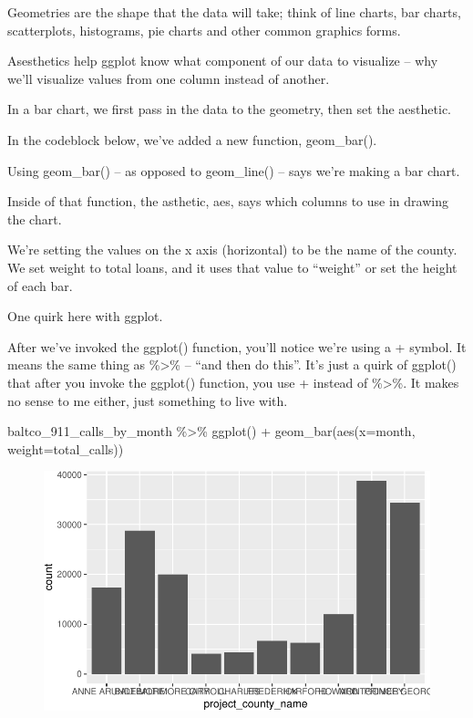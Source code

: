 \documentclass[
  letterpaper,
  DIV=11,
  numbers=noendperiod]{scrreprt}
\newenvironment{Shaded}{\begin{snugshade}}{\end{snugshade}}
\newcommand{\AttributeTok}[1]{\textcolor[rgb]{0.40,0.45,0.13}{#1}}
\newcommand{\FunctionTok}[1]{\textcolor[rgb]{0.28,0.35,0.67}{#1}}
\newcommand{\NormalTok}[1]{\textcolor[rgb]{0.00,0.23,0.31}{#1}}
\newcommand{\SpecialCharTok}[1]{\textcolor[rgb]{0.37,0.37,0.37}{#1}}
\begin{document}
Geometries are the shape that the data will take; think of line charts,
bar charts, scatterplots, histograms, pie charts and other common
graphics forms.

Asesthetics help ggplot know what component of our data to visualize --
why we'll visualize values from one column instead of another.

In a bar chart, we first pass in the data to the geometry, then set the
aesthetic.

In the codeblock below, we've added a new function, geom\_bar().

Using geom\_bar() -- as opposed to geom\_line() -- says we're making a
bar chart.

Inside of that function, the asthetic, aes, says which columns to use in
drawing the chart.

We're setting the values on the x axis (horizontal) to be the name of
the county. We set weight to total loans, and it uses that value to
``weight'' or set the height of each bar.

One quirk here with ggplot.

After we've invoked the ggplot() function, you'll notice we're using a +
symbol. It means the same thing as \%\textgreater\% -- ``and then do
this''. It's just a quirk of ggplot() that after you invoke the ggplot()
function, you use + instead of \%\textgreater\%. It makes no sense to me
either, just something to live with.

\begin{Shaded}
\begin{Highlighting}[]
\NormalTok{baltco\_911\_calls\_by\_month }\SpecialCharTok{\%\textgreater{}\%}
  \FunctionTok{ggplot}\NormalTok{() }\SpecialCharTok{+}
  \FunctionTok{geom\_bar}\NormalTok{(}\FunctionTok{aes}\NormalTok{(}\AttributeTok{x=}\NormalTok{month, }\AttributeTok{weight=}\NormalTok{total\_calls))}
\end{Highlighting}
\end{Shaded}

\begin{figure}[H]

{\centering \includegraphics{./visualizing-for-reporting_files/figure-pdf/unnamed-chunk-5-1.pdf}

}

\end{figure}
\end{document}
